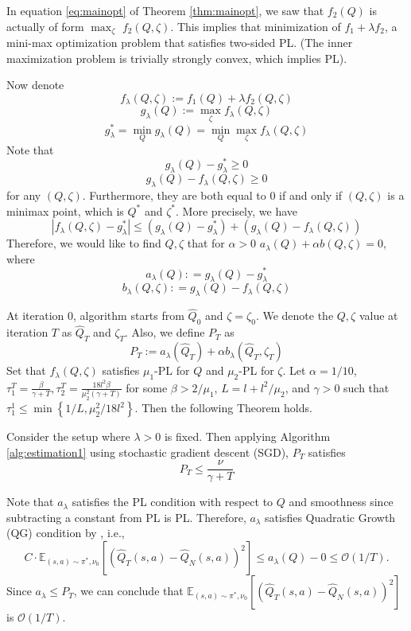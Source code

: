     In equation \ref{eq:mainopt} of Theorem \ref{thm:mainopt}, we saw that $f_2(Q)$ is actually of form $\max_\zeta$ $f_2(Q, \zeta)$. This implies that minimization of $f_1+\lambda f_2$, a mini-max optimization problem that satisfies two-sided PL. (The inner maximization problem is trivially strongly convex, which implies PL). 
    
    Now denote $$
    f_\lambda(Q, \zeta) :=  f_1(Q)+\lambda f_2(Q, \zeta)$$
    $$g_\lambda(Q) := \max_\zeta f_\lambda(Q, \zeta)
    $$ 
    $$
    g^*_\lambda = \min_Q g_\lambda(Q) = \min_Q \max_\zeta f_\lambda(Q, \zeta)$$
    Note that $$g_\lambda(Q)-g^*_\lambda\ge 0$$
    $$g_\lambda(Q)-f_\lambda(Q, \zeta)\ge 0
    $$
    for any $(Q, \zeta)$. Furthermore, they are both equal to 0 if and only if $(Q, \zeta)$ is a minimax point, which is $Q^\ast$ and $\zeta^\ast$. More precisely, we have
    $$
    |f_\lambda(Q,\zeta) - g_\lambda^\ast| \le (g_\lambda(Q)-g^*_\lambda) + (g_\lambda(Q)-f_\lambda(Q, \zeta))
    $$    
    Therefore, we would like to find $Q, \zeta$ that for $\alpha>0$ $a_\lambda(Q) + \alpha b(Q, \zeta) = 0$, where 
    $$a_\lambda(Q): = g_\lambda(Q)-g^*_\lambda$$
    $$b_\lambda(Q, \zeta): = g_\lambda(Q)-f_\lambda(Q, \zeta)$$
    
    \noindent At iteration 0, algorithm starts from $\hat{Q}_0$ and $\zeta=\zeta_0$. We denote the $Q, \zeta$ value at iteration $T$ as $\hat{Q}_T$ and $\zeta_T$. Also, we define $P_T$ as
    $$P_T:= a_\lambda(\hat{Q}_T) + \alpha b_\lambda(\hat{Q}_T, \zeta_T)$$
    Set that $f_\lambda(Q, \zeta)$ satisfies $\mu_1$-PL for $Q$ and $\mu_2$-PL for $\zeta$. Let $\alpha = 1/10$, $\tau_1^T=\frac{\beta}{\gamma+T}, \tau_2^T=\frac{18 l^2 \beta}{\mu_2^2(\gamma+T)}$ for some $\beta>2 / \mu_1$, $L=l+l^2 / \mu_2$, and $ \gamma>0$ such that $\tau_1^1 \leq \min \left\{1 / L, \mu_2^2 / 18 l^2\right\}$. Then the following Theorem holds.

    \begin{thm}\label{thm:Yang} Consider the setup where $\lambda>0$ is fixed. Then applying Algorithm \ref{alg:estimation1} using stochastic gradient descent (SGD), $P_T$ satisfies
    $$
    P_T \leq \frac{\nu}{\gamma+T}
    $$
    \end{thm}

Note that $a_\lambda$ satisfies the PL condition with respect to $Q$ and smoothness since subtracting a constant from PL is PL. Therefore, $a_\lambda$ satisfies Quadratic Growth (QG) condition by \cite{liao2024error}, i.e., 
$$
C \cdot \mathbb{E}_{(s, a) \sim \pi^*, \nu_0}\left[\left(\hat{Q}_T(s, a)-\hat{Q}_N(s, a)\right)^2\right] \le a_\lambda(Q)-0 \le \mathcal{O}(1/T).
$$
Since $a_\lambda \le P_T$, we can conclude that $ \mathbb{E}_{(s, a) \sim \pi^*, \nu_0}\left[\left(\hat{Q}_T(s, a)-\hat{Q}_N(s, a)\right)^2\right]$ is $\mathcal{O}(1/T)$.
 

